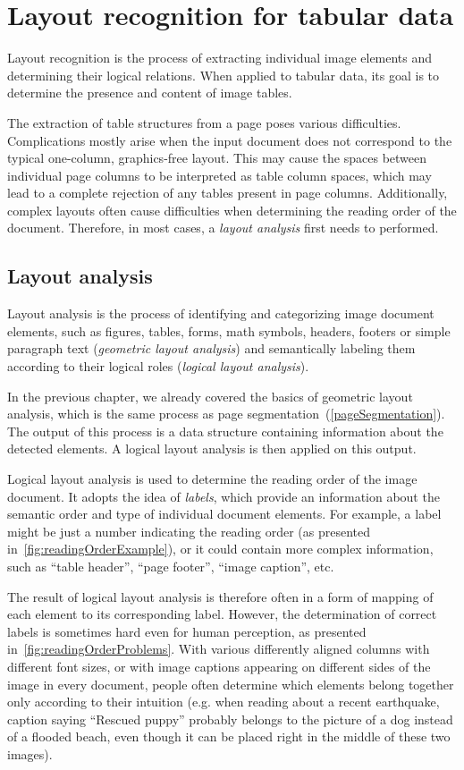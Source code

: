 \chapter{Layout recognition for tabular data}

Layout recognition is the process of extracting individual image elements and determining their logical relations. When applied to tabular data, its goal is to determine the presence and content of image tables. 

The extraction of table structures from a page poses various difficulties. Complications mostly arise when the input document does not correspond to the typical one-column, graphics-free layout. This may cause the spaces between individual page columns to be interpreted as table column spaces, which may lead to a complete rejection of any tables present in page columns. Additionally, complex layouts often cause difficulties when determining the reading order of the document. Therefore, in most cases, a \emph{layout analysis} first needs to performed.

\section{Layout analysis}

Layout analysis is the process of identifying and categorizing image document elements, such as figures, tables, forms, math symbols, headers, footers or simple paragraph text (\emph{geometric layout analysis}) and semantically labeling them according to their logical roles (\emph{logical layout analysis}).

In the previous chapter, we already covered the basics of geometric layout analysis, which is the same process as page segmentation~(\cref{pageSegmentation}). The output of this process is a data structure containing information about the detected elements. A logical layout analysis is then applied on this output.

Logical layout analysis is used to determine the reading order of the image document. It adopts the idea of \emph{labels}, which provide an information about the semantic order and type of individual document elements. For example, a label might be just a number indicating the reading order (as presented in~\cref{fig:readingOrderExample}), or it could contain more complex information, such as ``table header'', ``page footer'', ``image caption'', etc.

The result of logical layout analysis is therefore often in a form of mapping of each element to its corresponding label. However, the determination of correct labels is sometimes hard even for human perception, as presented in~\cref{fig:readingOrderProblems}. With various differently aligned columns with different font sizes, or with image captions appearing on different sides of the image in every document, people often determine which elements belong together only according to their intuition (e.g. when reading about a recent earthquake, caption saying “Rescued puppy” probably belongs to the picture of a dog instead of a flooded beach, even though it can be placed right in the middle of these two images).

